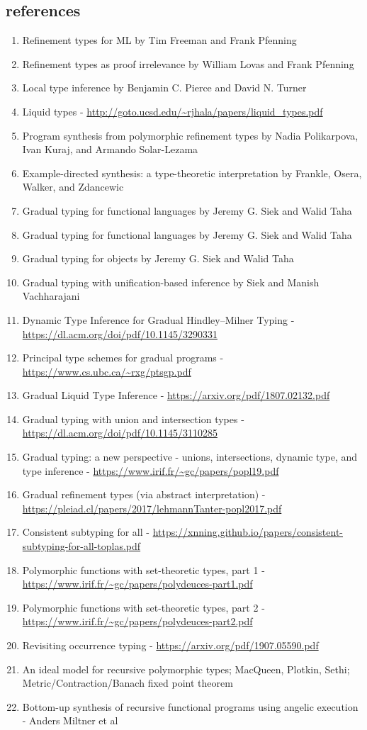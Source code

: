 \documentclass[sigplan,screen]{acmart}
\begin{document}
\subsection*{references}
\begin{enumerate}
\item Refinement types for ML by Tim Freeman and Frank Pfenning 
\item Refinement types as proof irrelevance by William Lovas and Frank Pfenning 
\item Local type inference by Benjamin C. Pierce and David N. Turner
\item Liquid types - \url{http://goto.ucsd.edu/~rjhala/papers/liquid_types.pdf}
\item Program synthesis from polymorphic refinement types by Nadia Polikarpova, Ivan Kuraj, and Armando Solar-Lezama
\item Example-directed synthesis: a type-theoretic interpretation by Frankle, Osera, Walker, and Zdancewic
\item Gradual typing for functional languages by Jeremy G. Siek and Walid Taha 
\item Gradual typing for functional languages by Jeremy G. Siek and Walid Taha 
\item Gradual typing for objects by Jeremy G. Siek and Walid Taha 
\item Gradual typing with unification-based inference by Siek and Manish Vachharajani 
\item Dynamic Type Inference for Gradual Hindley–Milner Typing - \url{https://dl.acm.org/doi/pdf/10.1145/3290331}
\item Principal type schemes for gradual programs - \url{https://www.cs.ubc.ca/~rxg/ptsgp.pdf}
\item Gradual Liquid Type Inference - \url{https://arxiv.org/pdf/1807.02132.pdf}
\item Gradual typing with union and intersection types - \url{https://dl.acm.org/doi/pdf/10.1145/3110285}
\item Gradual typing: a new perspective - unions, intersections, dynamic type, and type inference - \url{https://www.irif.fr/~gc/papers/popl19.pdf}
\item Gradual refinement types (via abstract interpretation) - \url{https://pleiad.cl/papers/2017/lehmannTanter-popl2017.pdf}
\item Consistent subtyping for all - \url{https://xnning.github.io/papers/consistent-subtyping-for-all-toplas.pdf}
\item Polymorphic functions with set-theoretic types, part 1 - \url{https://www.irif.fr/~gc/papers/polydeuces-part1.pdf}
\item Polymorphic functions with set-theoretic types, part 2 - \url{https://www.irif.fr/~gc/papers/polydeuces-part2.pdf}
\item Revisiting occurrence typing - \url{https://arxiv.org/pdf/1907.05590.pdf} 
\item An ideal model for recursive polymorphic types; MacQueen, Plotkin, Sethi; Metric/Contraction/Banach fixed point theorem
\item Bottom-up synthesis of recursive functional programs using angelic execution - Anders Miltner et al


\end{enumerate}
\end{document}
